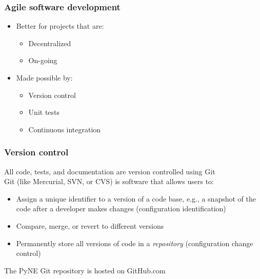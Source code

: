 \documentclass[12pt]{beamer}
\begin{document}
\begin{frame}
\frametitle{Agile software development}

\begin{itemize}
\item{Better for projects that are:}
    \begin{itemize}
    \item{Decentralized}
    \item{On-going}
    \end{itemize}
\item{Made possible by:}
    \begin{itemize}
    \item{Version control}
    \item{Unit tests}
    \item{Continuous integration}
    \end{itemize}
\end{itemize}

\end{frame}


\begin{frame}
\frametitle{Version control}

All code, tests, and documentation are version controlled using Git \cite{git} \\
\vspace{0.3cm}
Git (like Mercurial, SVN, or CVS) is software that allows users to:
\begin{itemize}
\item{Assign a unique identifier to a version of a code base, e.g., a snapshot of 
      the code after a developer makes changes (\alert{configuration identification})}
\item{Compare, merge, or revert to different versions}
\item{Permanently store all versions of code in a \emph{repository} (\alert{configuration change control})}
\end{itemize}
\vspace{0.3cm}
The PyNE Git repository is hosted on GitHub.com

\end{frame}
\end{document}

